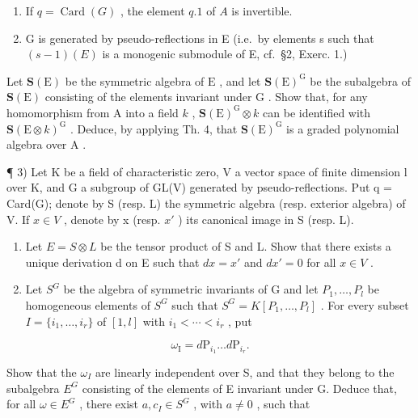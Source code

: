 \begin{enumerate}
\def\labelenumi{(\roman{enumi})}
\item
  If \(q = \operatorname{Card}(G)\) , the element \(q.1\) of \(A\) is invertible.
\item
  G is generated by pseudo-reflections in E (i.e.~by elements s such that \((s - 1)(E)\) is a monogenic submodule of E, cf.~§2, Exerc. 1.)
\end{enumerate}

Let \(\mathbf{S}(\mathrm{E})\) be the symmetric algebra of \(\mathrm{E}\) , and let \(\mathbf{S}(\mathrm{E})^{\mathrm{G}}\) be the subalgebra of \(\mathbf{S}(\mathrm{E})\) consisting of the elements invariant under \(\mathrm{G}\) . Show that, for any homomorphism from \(\mathrm{A}\) into a field \(k\) , \(\mathbf{S}(\mathrm{E})^{\mathrm{G}} \otimes k\) can be identified with \(\mathbf{S}(\mathrm{E} \otimes k)^{\mathrm{G}}\) . Deduce, by applying Th. 4, that \(\mathbf{S}(\mathrm{E})^{\mathrm{G}}\) is a graded polynomial algebra over \(\mathrm{A}\) .

¶ 3) Let K be a field of characteristic zero, V a vector space of finite dimension l over K, and G a subgroup of GL(V) generated by pseudo-reflections. Put q = Card(G); denote by S (resp. L) the symmetric algebra (resp. exterior algebra) of V. If \(x \in V\) , denote by x (resp. \(x'\) ) its canonical image in S (resp. L).

\begin{enumerate}
\def\labelenumi{\alph{enumi})}
\item
  Let \(E = S \otimes L\) be the tensor product of S and L. Show that there exists a unique derivation d on E such that \(dx = x'\) and \(dx' = 0\) for all \(x \in V\) .
\item
  Let \(S^{G}\) be the algebra of symmetric invariants of G and let \(P_{1},\ldots,P_{l}\) be homogeneous elements of \(S^{G}\) such that \(S^{G}=K[P_{1},\ldots,P_{l}]\) . For every subset \(I=\{i_{1},\ldots,i_{r}\}\) of \([1,l]\) with \(i_{1}<\cdots<i_{r}\) , put
\end{enumerate}

\[
\omega_ {\mathrm{I}} = d \mathrm{P} _ {i _ {1}} \dots d \mathrm{P} _ {i _ {r}}.
\]

Show that the \(\omega_{I}\) are linearly independent over S, and that they belong to the subalgebra \(E^{G}\) consisting of the elements of E invariant under G. Deduce that, for all \(\omega \in E^{G}\) , there exist \(a, c_{I} \in S^{G}\) , with \(a \neq 0\) , such that

